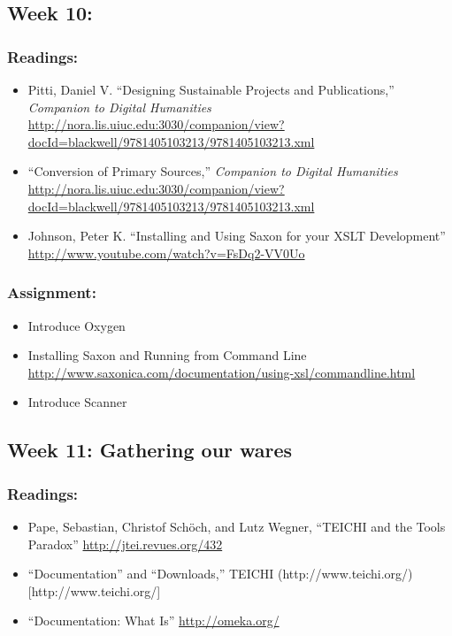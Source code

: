 \documentclass[]{article}
\begin{document}
\subsection{Week 10:}\label{week-10}

\subsubsection{Readings:}\label{readings-8}

\begin{itemize}
\itemsep1pt\parskip0pt
\item
  Pitti, Daniel V. ``Designing Sustainable Projects and Publications,''
  \emph{Companion to Digital Humanities}
  \url{http://nora.lis.uiuc.edu:3030/companion/view?docId=blackwell/9781405103213/9781405103213.xml}
\item
  ``Conversion of Primary Sources,'' \emph{Companion to Digital
  Humanities}
  \url{http://nora.lis.uiuc.edu:3030/companion/view?docId=blackwell/9781405103213/9781405103213.xml}
\item
  Johnson, Peter K. ``Installing and Using Saxon for your XSLT
  Development'' \url{http://www.youtube.com/watch?v=FsDq2-VV0Uo}
\end{itemize}

\subsubsection{Assignment:}\label{assignment-8}

\begin{itemize}
\itemsep1pt\parskip0pt
\item
  Introduce Oxygen
\item
  Installing Saxon and Running from Command Line
  \url{http://www.saxonica.com/documentation/using-xsl/commandline.html}
\item
  Introduce Scanner
\end{itemize}

\subsection{Week 11: Gathering our
wares}\label{week-11-gathering-our-wares}

\subsubsection{Readings:}\label{readings-9}

\begin{itemize}
\itemsep1pt\parskip0pt
\item
  Pape, Sebastian, Christof Schöch, and Lutz Wegner, ``TEICHI and the
  Tools Paradox'' \url{http://jtei.revues.org/432}
\item
  ``Documentation'' and ``Downloads,'' TEICHI
  (http://www.teichi.org/){[}http://www.teichi.org/{]}
\item
  ``Documentation: What Is'' \url{http://omeka.org/}
\end{itemize}
\end{document}
